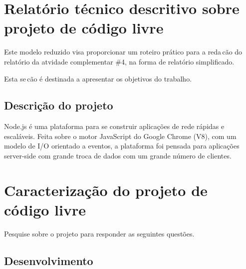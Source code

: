 \documentclass[12pt,a4paper]{article} %
\newcommand\BackgroundStructure{ %
\setlength{\unitlength}{1mm} %

\setlength\fboxsep{0mm} %
\setlength\fboxrule{0.5mm} %
\put(10, 20pr){\fcolorbox{black}{gray!5}{\framebox(155,247){}}} %
\put(165, 20){\fcolorbox{black}{gray!10}{\framebox(37,247){}}} %
\put(10, 262){\fcolorbox{black}{white!10}{\framebox(192, 25){}}} %
\put(175, 263){\texttt{[image: ]}} %
}
\begin{document}


\section{Relat\'orio t\'ecnico descritivo sobre projeto de c\'odigo livre} 

Este modelo reduzido visa proporcionar um roteiro pr\'atico para a reda\,c\~ao do relatório da atvidade complementar \#4, na forma de relat\'orio simplificado. 

Esta se\,c\~ao \'e destinada a apresentar os objetivos do trabalho.\\

\subsection{Descrição do projeto}

Node.js é uma plataforma para se construir aplicações de rede rápidas e escaláveis. Feita sobre o motor JavaScript do Google Chrome (V8), com um modelo de I/O orientado a eventos, a plataforma foi pensada para aplicações server-side com grande troca de dados com um grande número de clientes.

\section{Caracterização do projeto de código livre} 
Pesquise sobre o projeto para responder as seguintes questões.


\subsection{Desenvolvimento}
\end{document}
